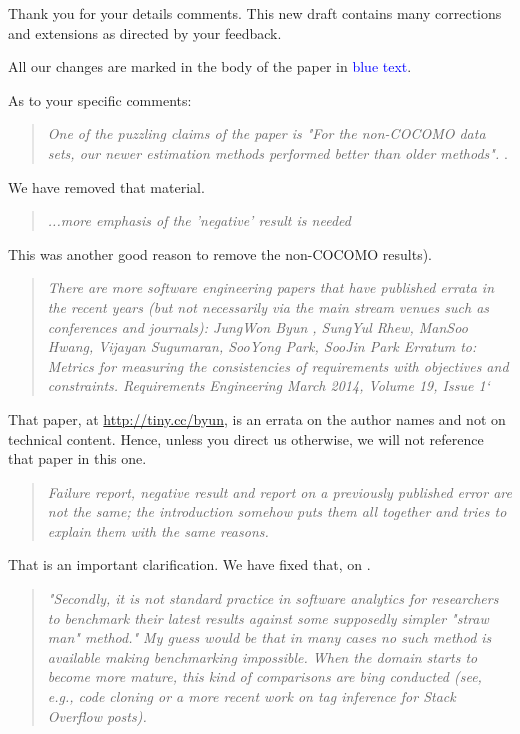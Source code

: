 \noindent
Thank you for your details comments.  This new draft
contains many corrections and extensions as directed by your feedback.

All our changes are marked in the body of the paper in \textcolor{blue}{blue text}.
 

As to your specific comments: 
 
\begin{quote}{\em One of the puzzling claims of the paper is "For the non-COCOMO data sets, our newer estimation methods performed better than older methods". }. \end{quote}

\noindent
We have removed
that material.

\begin{quote}{\em ...more emphasis of the 'negative' result is needed}\end{quote}

\noindent
This was another good reason to remove the
non-COCOMO results).

\begin{quote}{\em There are more software engineering papers that have published errata in the recent years (but not necessarily via the main stream venues such as conferences and journals): JungWon Byun , SungYul Rhew, ManSoo Hwang, Vijayan Sugumaran, SooYong Park, SooJin Park Erratum to: Metrics for measuring the consistencies of requirements with objectives and constraints. Requirements Engineering March 2014, Volume 19, Issue 1`}\end{quote}

\noindent
That paper, at \url{http://tiny.cc/byun},
is an errata on the author names
and not on technical content. Hence, unless you direct us otherwise,
we will not reference that paper in this one.

\begin{quote}{\em Failure report, negative result and report on a previously published error are not the same; the introduction somehow puts them all together and tries to explain them with the same reasons.}\end{quote}



\noindent
That is an  important clarification.
We have fixed that, on .

\begin{quote}{\em "Secondly, it is not standard practice in software analytics for researchers to benchmark their latest results against some supposedly simpler "straw man" method." My guess would be that in many cases no such method is available making benchmarking impossible. When the domain starts to become more mature, this kind of comparisons are bing conducted (see, e.g., code cloning or a more recent work on tag inference for Stack Overflow posts).}\end{quote}


